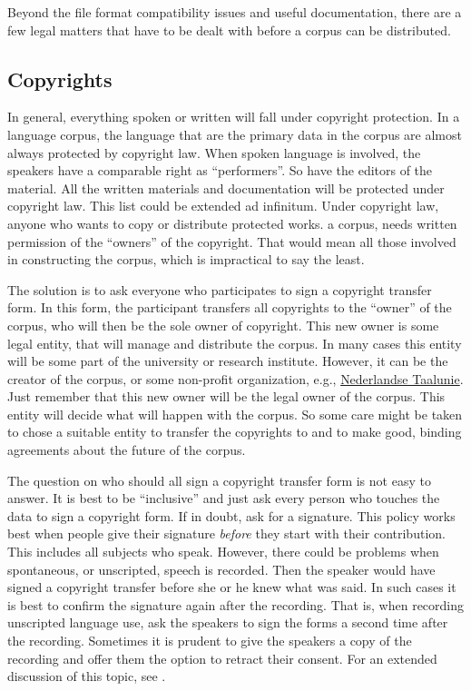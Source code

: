 \documentclass[10pt, a4paper]{article}
\begin{document}
Beyond the file format compatibility issues and useful documentation, there are a few legal matters that have to be dealt with before a corpus can be distributed.

\subsection{Copyrights}\label{Copyrights}

In general, everything spoken or written will fall under copyright protection. In a language corpus, the language that are the primary data in the corpus are almost always protected by copyright law. When spoken language is involved, the speakers have a comparable right as ``performers''. So have the editors of the material. All the written materials and documentation will be protected under copyright law. This list could be extended ad infinitum. Under copyright law, anyone who wants to copy or distribute protected works. a corpus, needs written permission of the ``owners'' of the copyright. That would mean all those involved in constructing the corpus, which is impractical to say the least.

The solution is to ask everyone who participates to sign a copyright transfer form. In this form, the participant transfers all copyrights to the ``owner'' of the corpus, who will then be the sole owner of copyright. This new owner is some legal entity, that will manage and distribute the corpus. In many cases this entity will be some part of the university or research institute. However, it can be the creator of the corpus, or some non-profit organization, e.g., \href{http://taalunie.org/nederlandse-taalunie-0}{Nederlandse Taalunie}. Just remember that this new owner will be the legal owner of the corpus. This entity will decide what will happen with the corpus. So some care might be taken to chose a suitable entity to transfer the copyrights to and to make good, binding agreements about the future of the corpus.

The question on who should all sign a copyright transfer form is not easy to answer. It is best to be ``inclusive'' and just ask every person who touches the data to sign a copyright form. If in doubt, ask for a signature. This policy works best when people give their signature \emph{before} they start with their contribution. This includes all subjects who speak. However, there could be problems when spontaneous, or unscripted, speech is recorded. Then the speaker would have signed a copyright transfer before she or he knew what was said. In such cases it is best to confirm the signature again after the recording. That is, when recording unscripted language use, ask the speakers to sign the forms a second time after the recording. Sometimes it is prudent to give the speakers a copy of the recording and offer them the option to retract their consent. For an extended discussion of this topic, see \cite{vanSon2008ifadv,VanSon2009Prom}.
\end{document}
